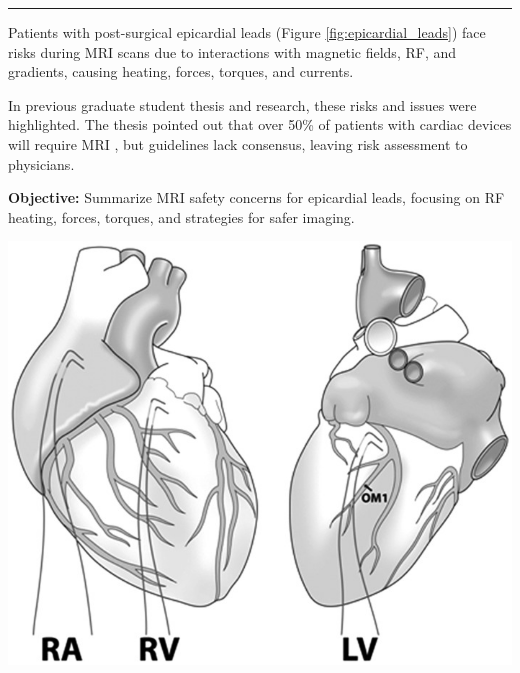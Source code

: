 \documentclass[final]{article}
\newcommand{\posterSection}[1]{
    \noindent{
        \color{DarkBlue}
        \fontsize{50}{60}\bfseries #1
    }
    \vspace{0.5em}
    \hrule
    \vspace{1em}
}
\renewcommand{\normalsize}{\fontsize{28}{34}\selectfont}
\newcommand{\boldtext}[1]{{\fontseries{b}\selectfont #1}}
\begin{document}
\setlength{\columnsep}{1.5cm} %
\begin{multicols}{3}

\posterSection{Introduction}



\begin{multicols}{2}
	\begin{minipage}[t]{0.17\textwidth}
		\normalsize
		Patients with post-surgical epicardial leads (Figure \ref{fig:epicardial_leads}) face risks during MRI scans due to interactions with magnetic fields, RF, and gradients, causing heating, forces, torques, and currents.
		
		In previous graduate student thesis and research, these risks and issues were highlighted. The thesis pointed out that over 50\% of patients with cardiac devices will require MRI \cite{haddix2022, aboyewa2021}, but guidelines lack consensus, leaving risk assessment to physicians.
		
		\textbf{Objective:} Summarize MRI safety concerns for epicardial leads, focusing on RF heating, forces, torques, and strategies for safer imaging.
	\end{minipage}%
	\hfill
	\hspace*{-0.25\linewidth} %
	\begin{minipage}[t]{0.23\textwidth}
		\centering
		\includegraphics[width=0.5\linewidth]{Position-of-temporary-pacing-wires-RA-right-atrium-RV-right-ventricular-outflow.jpg} %
		

\end{minipage}
\end{multicols}
\end{multicols}
\end{document}

